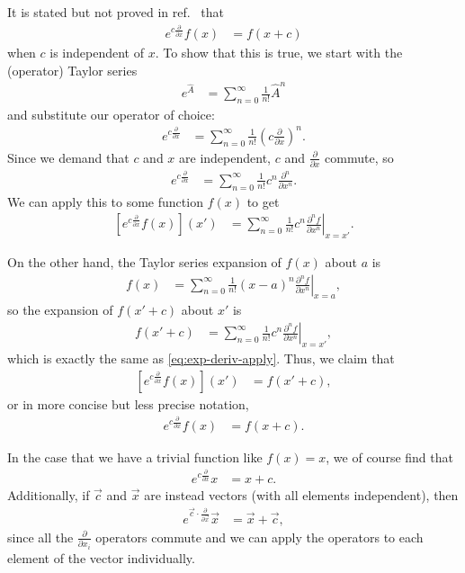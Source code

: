 It is stated but not proved in ref.~\cite{tuckerman1992reversible} that
\begin{align}
	e^{c \frac{\partial}{\partial x}} f(x)
	&= f(x + c)
\end{align}
when $c$ is independent of $x$.
To show that this is true, we start with the (operator) Taylor series~\cite[48]{sakurai1985modern}
\begin{align}
	e^{\hat{A}}
	&= \sum_{n=0}^\infty \frac{1}{n!} \hat{A}^n
\end{align}
and substitute our operator of choice:
\begin{align}
	e^{c \frac{\partial}{\partial x}}
	&= \sum_{n=0}^\infty \frac{1}{n!} \left( c \frac{\partial}{\partial x} \right)^n.
\end{align}
Since we demand that $c$ and $x$ are independent, $c$ and $\frac{\partial}{\partial x}$ commute, so
\begin{align}
	e^{c \frac{\partial}{\partial x}}
	&= \sum_{n=0}^\infty \frac{1}{n!} c^n \frac{\partial^n}{\partial x^n}.
\end{align}
We can apply this to some function $f(x)$ to get
\begin{align}
	\left[ e^{c \frac{\partial}{\partial x}} f(x) \right] (x')
	&= \sum_{n=0}^\infty \frac{1}{n!} c^n \left. \frac{\partial^n f}{\partial x^n} \right|_{x=x'}.
		\label{eq:exp-deriv-apply}
\end{align}

On the other hand, the Taylor series expansion of $f(x)$ about $a$ is~\cite[754]{stewart2012calculus}
\begin{align}
	f(x)
	&= \sum_{n=0}^\infty \frac{1}{n!} (x-a)^n \left. \frac{\partial^n f}{\partial x^n} \right|_{x=a},
\end{align}
so the expansion of $f(x' + c)$ about $x'$ is
\begin{align}
	f(x' + c)
	&= \sum_{n=0}^\infty \frac{1}{n!} c^n \left. \frac{\partial^n f}{\partial x^n} \right|_{x=x'},
\end{align}
which is exactly the same as \cref{eq:exp-deriv-apply}.
Thus, we claim that
\begin{align}
	\left[ e^{c \frac{\partial}{\partial x}} f(x) \right] (x')
	&= f(x' + c),
\end{align}
or in more concise but less precise notation,
\begin{align}
	e^{c \frac{\partial}{\partial x}} f(x)
	&= f(x + c).
\end{align}

In the case that we have a trivial function like $f(x) = x$, we of course find that
\begin{align}
	e^{c \frac{\partial}{\partial x}} x
	&= x + c.
\end{align}
Additionally, if $\vec{c}$ and $\vec{x}$ are instead vectors (with all elements independent), then
\begin{align}
	e^{\vec{c} \cdot \frac{\partial}{\partial \vec{x}}} \vec{x}
	&= \vec{x} + \vec{c},
		\label{eq:exp-deriv}
\end{align}
since all the $\frac{\partial}{\partial x_i}$ operators commute and we can apply the operators to each element of the vector individually.
